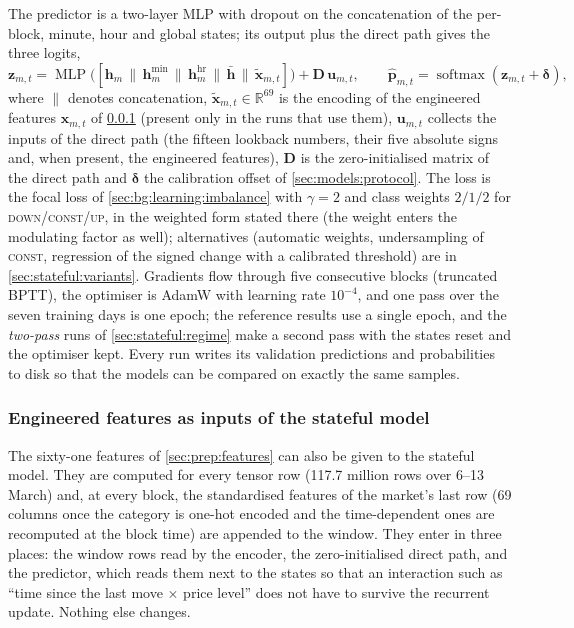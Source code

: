 The predictor is a two-layer MLP with dropout on the concatenation of the per-block,
minute, hour and global states; its output plus the direct path gives the three logits,
\begin{equation}
  \mathbf{z}_{m,t} = \operatorname{MLP}\bigl([\mathbf{h}_m \,\|\, \mathbf{h}^{\min}_m \,\|\,
  \mathbf{h}^{\mathrm{hr}}_m \,\|\, \bar{\mathbf{h}} \,\|\, \tilde{\mathbf{x}}_{m,t}]\bigr) + \mathbf{D}\,\mathbf{u}_{m,t},
  \qquad
  \hat{\mathbf{p}}_{m,t} = \operatorname{softmax}(\mathbf{z}_{m,t} + \boldsymbol{\delta}),
  \label{eq:predictor}
\end{equation}
where $\|$ denotes concatenation, $\tilde{\mathbf{x}}_{m,t} \in \mathbb{R}^{69}$ is the encoding
of the engineered features $\mathbf{x}_{m,t}$ of \cref{sec:models:handinputs} (present only in
the runs that use them), $\mathbf{u}_{m,t}$ collects the inputs
of the direct path (the fifteen lookback numbers, their five absolute signs and, when
present, the engineered features), $\mathbf{D}$ is the zero-initialised matrix of the
direct path and $\boldsymbol{\delta}$ the calibration offset of \cref{sec:models:protocol}.  The loss is the focal loss of \cref{sec:bg:learning:imbalance} with $\gamma = 2$ and class weights $2/1/2$ for
\textsc{down}/\textsc{const}/\textsc{up}, in the weighted form stated there (the weight
enters the modulating factor as well); alternatives (automatic weights,
undersampling of \textsc{const}, regression of the signed change with a calibrated
threshold) are in \cref{sec:stateful:variants}.  Gradients flow through five consecutive
blocks (truncated BPTT), the optimiser is AdamW with learning rate $10^{-4}$, and one
pass over the seven training days is one epoch; the reference results use a single epoch,
and the \emph{two-pass} runs of \cref{sec:stateful:regime} make a second pass with the
states reset and the optimiser kept.  Every run writes its validation predictions and
probabilities to disk so that the models can be compared on exactly the same samples.

\subsubsection{Engineered features as inputs of the stateful model}
\label{sec:models:handinputs}

The sixty-one features of \cref{sec:prep:features} can also be given to the stateful
model.  They are computed for every tensor row (117.7 million rows over 6--13 March) and, at
every block, the standardised features of the market's last row (69 columns once the category
is one-hot encoded and the time-dependent ones are recomputed at the block time) are
appended to the window.  They enter in three places: the window rows read by the encoder,
the zero-initialised direct path, and the predictor, which reads them next to the states so
that an interaction such as ``time since the last move $\times$ price level'' does not have
to survive the recurrent update.  Nothing else changes.

